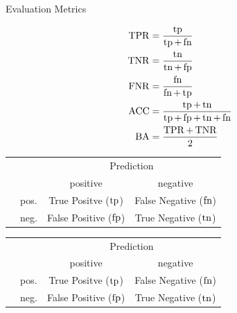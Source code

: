 \begin{frame}{Evaluation Metrics}
    \begin{minipage}{0.48\textwidth}
        \begin{align*}
            \operatorname{TPR} &= \frac{\operatorname{tp}}{\operatorname{tp} + \operatorname{fn}} \\
            \operatorname{TNR} &= \frac{\operatorname{tn}}{\operatorname{tn} + \operatorname{fp}} \\
            \operatorname{FNR} &= \frac{\operatorname{fn}}{\operatorname{fn} + \operatorname{tp}} \\
            \operatorname{ACC} &= \frac{\operatorname{tp} + \operatorname{tn}}{\operatorname{tp} + \operatorname{fp} + \operatorname{tn} + \operatorname{fn}} \\
            \operatorname{BA} &= \frac{\operatorname{TPR} + \operatorname{TNR}}{2}
        \end{align*}
    \end{minipage}
    \begin{minipage}{0.48\textwidth}
            {%
            \begin{table}
                \centering
                \begin{tabular}{r l c c}
                    & & \multicolumn{2}{c}{Prediction} \\
                    & & positive & negative \\
                    \parbox[t]{2mm}{} &  pos. & \colorbox{darkacc}{True Positve ($\operatorname{tp}$)} & False Negative ($\operatorname{fn}$) \\
                    & neg. & False Positive ($\operatorname{fp}$) & \colorbox{darkacc}{True Negative ($\operatorname{tn}$)} \\
                \end{tabular}
            \end{table}%
            }
            {%
            \begin{table}
                \centering
                \begin{tabular}{r l c c}
                    & & \multicolumn{2}{c}{Prediction} \\
                    & & positive & negative \\
                    \parbox[t]{2mm}{} &  pos. & \colorbox{white!92!black}{True Positve ($\operatorname{tp}$)} & False Negative ($\operatorname{fn}$) \\
                    & neg. & False Positive ($\operatorname{fp}$) & \colorbox{white!92!black}{True Negative ($\operatorname{tn}$)} \\
                \end{tabular}
            \end{table}%
            }
    \end{minipage}
\end{frame}


